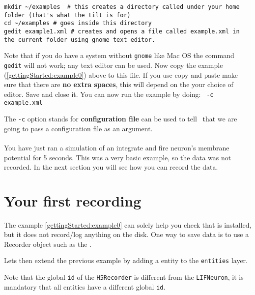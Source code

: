 \begin{lstlisting}[escapeinside=\{\}]
mkdir ~/examples  # this creates a directory called under your home folder (that's what the tilt is for)
cd ~/examples # goes inside this directory
gedit example1.xml # creates and opens a file called example.xml in the current folder using gnome text editor.
\end{lstlisting}

Note that if you do have a system without \texttt{gnome} like Mac OS the command \texttt{gedit} will not work; any text editor can be used. Now copy the example (\ref{gettingStarted:example0}) above to this file. If you use copy and paste make sure that there are \textbf{no extra spaces}, this will depend on the your choice of editor. Save and close it. You can now run the example by doing: \texttt{\progname\ -c example.xml}

The \texttt{-c} option stands for \textbf{configuration file} can be used to tell \progname\ that we are going to pass a configuration file as an argument.

\paragraph{} You have just ran a simulation of an integrate and fire neuron's membrane potential for 5 seconds. This was a very basic example, so the data was not recorded. In the next section you will see how you can record the data.

\section{Your first recording}
\paragraph{}
The example \ref{gettingStarted:example0} can solely help you check that \texttt{\progname} is installed, but it does not record/log anything on the disk. One way to save data is to use a Recorder object such as the .

Lets then extend the previous example by adding a  entity to the \texttt{entities} layer. 

Note that the global \texttt{id} of the \texttt{H5Recorder} is different from the \texttt{LIFNeuron}, it is mandatory that all entities have a different global \texttt{id}.


